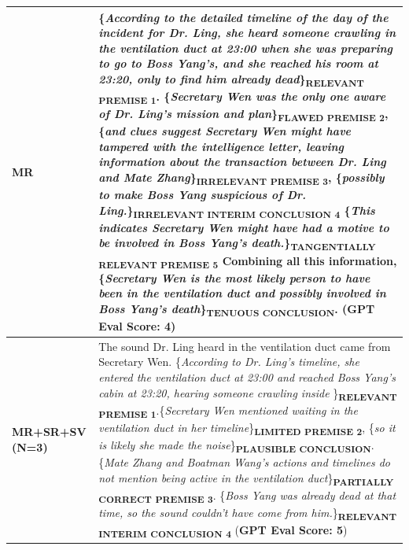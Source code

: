 \documentclass[11pt]{article}
\begin{document}
\begin{table}[ht]
{\begin{tabularx}{\textwidth}{|p{0.95cm}|X|}
\hline
\textbf{MR} & \{\textit{According to the detailed timeline of the day of the incident for Dr. Ling, she heard someone crawling in the ventilation duct at 23:00 when she was preparing to go to Boss Yang's, and she reached his room at 23:20, only to find him already dead}\}\textsubscript{\textbf{RELEVANT PREMISE 1}}. \{\textit{Secretary Wen was the only one aware of Dr. Ling's mission and plan}\}\textsubscript{\textbf{FLAWED PREMISE 2}}, \{\textit{and clues suggest Secretary Wen might have tampered with the intelligence letter, leaving information about the transaction between Dr. Ling and Mate Zhang}\}\textsubscript{\textbf{IRRELEVANT PREMISE 3}}, \{\textit{possibly to make Boss Yang suspicious of Dr. Ling.}\}\textsubscript{\textbf{IRRELEVANT INTERIM CONCLUSION 4}} \{\textit{This indicates Secretary Wen might have had a motive to be involved in Boss Yang's death.}\}\textsubscript{\textbf{TANGENTIALLY RELEVANT PREMISE 5}} Combining all this information, \{\textit{Secretary Wen is the most likely person to have been in the ventilation duct and possibly involved in Boss Yang's death}\}\textsubscript{\textbf{TENUOUS CONCLUSION}}. (\textbf{GPT Eval Score: 4}) \\
\hline
\textbf{MR\newline \hspace*{0.25cm}+\newline \hspace*{0.1cm}SR\newline \hspace*{0.25cm}+\newline \hspace*{0.1cm}SV \newline (N=3)}& The sound Dr. Ling heard in the ventilation duct came from Secretary Wen. \{\textit{According to Dr. Ling's timeline, she entered the ventilation duct at 23:00 and reached Boss Yang's cabin at 23:20, hearing someone crawling inside }\}\textsubscript{\textbf{RELEVANT PREMISE 1}}.\{\textit{Secretary Wen mentioned waiting in the ventilation duct in her timeline}\}\textsubscript{\textbf{LIMITED PREMISE 2}}, \{\textit{so it is likely she made the noise}\}\textsubscript{\textbf{PLAUSIBLE CONCLUSION}}. \{\textit{Mate Zhang and Boatman Wang's actions and timelines do not mention being active in the ventilation duct}\}\textsubscript{\textbf{PARTIALLY CORRECT PREMISE 3}}. \{\textit{Boss Yang was already dead at that time, so the sound couldn't have come from him.}\}\textsubscript{\textbf{RELEVANT INTERIM CONCLUSION 4}} (\textbf{GPT Eval Score: 5}) \\

\end{tabularx}}
\end{table}
\end{document}
